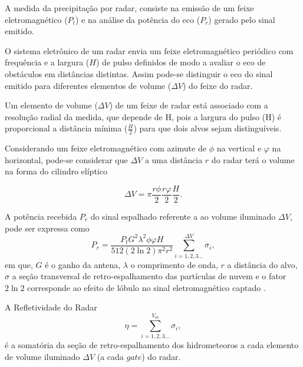 A medida da precipitação por radar, consiste na emissão de um feixe eletromagnético ($P_t$) e na análise da potência do eco ($P_r$) gerado pelo sinal emitido.

O sistema eletrônico de um radar envia um feixe eletromagnético periódico com frequência e a largura ($H$) de pulso definidos de modo a avaliar o eco de obstáculos em distâncias distintas. Assim pode-se distinguir o eco do sinal emitido para diferentes elementos de volume ($\Delta V$) do feixe do radar.

Um elemento de volume ($\Delta V$) de um feixe de radar está associado com a resolução radial da medida, que depende de H, pois a largura do pulso (H) é proporcional a distância mínima ($\frac{H}{2}$) para que dois alvos sejam distinguíveis.
 
Considerando um feixe eletromagnético com azimute de $\phi$ na vertical e $\varphi$ na horizontal, pode-se considerar que $\Delta V$ a uma distância $r$ do radar terá o volume na forma do cilindro elíptico

\begin{equation}
\Delta V = \pi \dfrac{r\phi}{2} \dfrac{r\varphi}{2} \dfrac{H}{2} .
\end{equation}
 
A potência recebida $P_r$ do sinal espalhado referente a ao volume iluminado $\Delta V$, pode ser expressa como
\begin{equation}
P_r = \dfrac{P_t G^2 \lambda^2 \phi \varphi H}{ 512 (2\ln2)\pi^2 r^2} \sum_{i=1, 2, 3 ... }^{\Delta V} \sigma_i ,
\label{radar1}
\end{equation}
em que, $G$ é o ganho da antena, $\lambda$ o comprimento de onda, $r$ a distância do alvo, $\sigma$ a seção transversal de retro-espalhamento das partículas de nuvem e o fator $2\ln2$ corresponde ao efeito de lóbulo no sinal eletromagnético captado \cite{battan1973}.

A Refletividade do Radar 
\begin{equation}
\eta = \sum_{i=1, 2, 3 ... }^{V_{m}} \sigma_i,
\label{refletividade}
\end{equation}
é a somatória da seção de retro-espalhamento dos hidrometeoros a cada elemento de volume iluminado $\Delta V$ (a cada $gate$) do radar.


